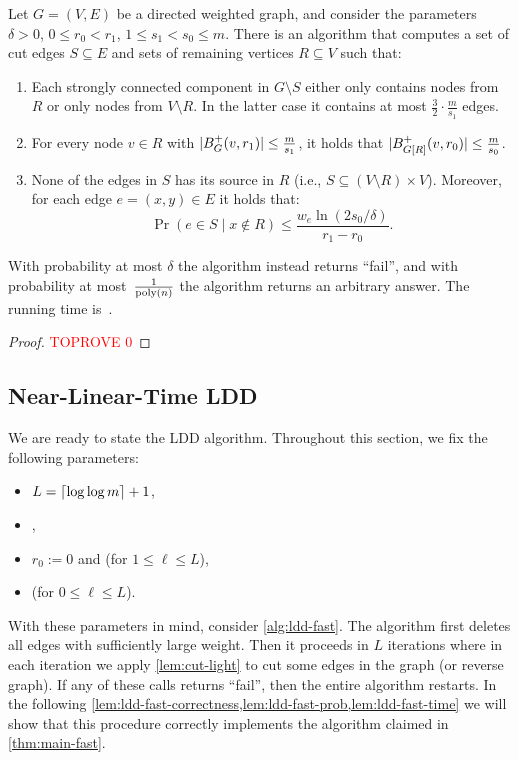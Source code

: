 \begin{lemma} \label{lem:cut-light}
Let $G = (V, E)$ be a directed weighted graph, and consider the parameters $\delta > 0$, $0 \leq r_0 < r_1$, $1 \leq s_1 < s_0 \leq m$. There is an algorithm that computes a set of cut edges $S \subseteq E$ and sets of remaining vertices $R \subseteq V$ such that:
\begin{enumerate}[label=(\roman*)]
    \item Each strongly connected component in $G \setminus S$ either only contains nodes from $R$ or only nodes from $V \setminus R$. In the latter case it contains at most $\frac32 \cdot \frac{m}{s_1}$ edges.
    \item For every node $v \in R$ with $|B^+_G(v, r_1)| \leq \frac{m}{s_1}$, it holds that $|B^+_{G[R]}(v, r_0)| \leq \frac{m}{s_0}$.
    \item None of the edges in $S$ has its source in $R$ (i.e., $S \subseteq (V \setminus R) \times V$). Moreover, for each edge $e = (x, y) \in E$ it holds that:
    \begin{equation*}
        \Pr(e \in S \mid x \not\in R) \leq \frac{w_e \ln(2s_0 / \delta)}{r_1 - r_0}.
    \end{equation*}
\end{enumerate}
With probability at most $\delta$ the algorithm instead returns ``fail'', and with probability at most~$\frac{1}{\operatorname{\text{{\rm poly}}}(n)}$ the algorithm returns an arbitrary answer. The running time is~.
\end{lemma}

\begin{proof}\textcolor{red}{TOPROVE 0}\end{proof}

\subsection{Near-Linear-Time LDD} \label{sec:ldd-fast:sec:algo}
We are ready to state the LDD algorithm. Throughout this section, we fix the following parameters:
\begin{itemize}
    \item $L = \lceil\log\log m\rceil + 1$,
    \item {},
    \item $r_0 := 0$ and  (for $1 \leq \ell \leq L$),
    \item {} (for $0 \leq \ell \leq L$).
\end{itemize}
With these parameters in mind, consider \cref{alg:ldd-fast}. The algorithm first deletes all edges with sufficiently large weight. Then it proceeds in $L$ iterations where in each iteration we apply \cref{lem:cut-light} to cut some edges in the graph (or reverse graph). If any of these calls returns ``fail'', then the entire algorithm restarts. In the following \cref{lem:ldd-fast-correctness,lem:ldd-fast-prob,lem:ldd-fast-time} we will show that this procedure correctly implements the algorithm claimed in \cref{thm:main-fast}.


